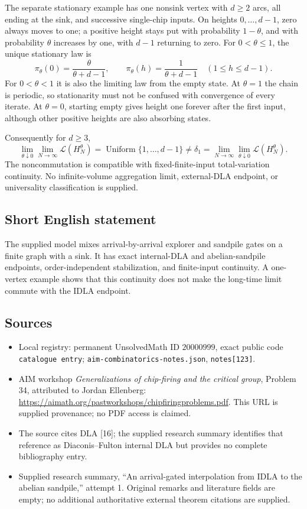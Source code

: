 \documentclass[11pt]{article}
\begin{document}
The separate stationary example has one nonsink vertex with \(d\geq2\) arcs, all ending at the sink, and successive single-chip inputs. On heights \(0,\ldots,d-1\), zero always moves to one; a positive height stays put with probability \(1-\theta\), and with probability \(\theta\) increases by one, with \(d-1\) returning to zero. For \(0<\theta\leq1\), the unique stationary law is
\[
 \pi_\theta(0)=\frac\theta{\theta+d-1},\qquad
 \pi_\theta(h)=\frac1{\theta+d-1}\quad(1\leq h\leq d-1).
\]
For \(0<\theta<1\) it is also the limiting law from the empty state. At \(\theta=1\) the chain is periodic, so stationarity must not be confused with convergence of every iterate. At \(\theta=0\), starting empty gives height one forever after the first input, although other positive heights are also absorbing states.

Consequently for \(d\geq3\),
\[
 \lim_{\theta\downarrow0}\lim_{N\to\infty}\mathcal L(H_N^\theta)
 =\operatorname{Uniform}\{1,\ldots,d-1\}
 \neq\delta_1
 =\lim_{N\to\infty}\lim_{\theta\downarrow0}\mathcal L(H_N^\theta).
\]
The noncommutation is compatible with fixed-finite-input total-variation continuity. No infinite-volume aggregation limit, external-DLA endpoint, or universality classification is supplied.
\subsection{Short English statement}
The supplied model mixes arrival-by-arrival explorer and sandpile gates on a finite graph with a sink. It has exact internal-DLA and abelian-sandpile endpoints, order-independent stabilization, and finite-input continuity. A one-vertex example shows that this continuity does not make the long-time limit commute with the IDLA endpoint.
\subsection{Sources}
\begin{itemize}
\item Local registry: permanent UnsolvedMath ID \(20000999\), exact public code \texttt{catalogue entry}; \texttt{aim-combinatorics-notes.json}, \texttt{notes[123]}.
\item AIM workshop \emph{Generalizations of chip-firing and the critical group}, Problem 34, attributed to Jordan Ellenberg: \url{https://aimath.org/pastworkshops/chipfiringproblems.pdf}. This URL is supplied provenance; no PDF access is claimed.
\item The source cites DLA [16]; the supplied research summary identifies that reference as Diaconis--Fulton internal DLA but provides no complete bibliography entry.
\item Supplied research summary, ``An arrival-gated interpolation from IDLA to the abelian sandpile,'' attempt 1. Original remarks and literature fields are empty; no additional authoritative external theorem citations are supplied.
\end{itemize}
\end{document}
